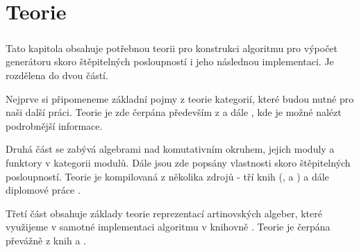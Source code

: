 \chapter{Teorie}

  \paragraph{}Tato kapitola obsahuje potřebnou teorii pro konstrukci algoritmu pro výpočet 
  generátoru skoro štěpitelných posloupností i jeho následnou implementaci. Je 
  rozdělena do dvou částí.
  
  Nejprve si připomeneme základní pojmy z teorie kategorií, které budou nutné pro naši další práci. 
  Teorie je zde čerpána především z \cite{3} a dále \cite{1}, kde je možné nalézt podrobnější informace.  
   
  Druhá část se zabývá algebrami nad komutativním okruhem, jejich 
  moduly a funktory v kategorii modulů. Dále jsou zde popsány vlastnosti
  skoro štěpitelných posloupností. Teorie je kompilovaná z několika 
  zdrojů - tří knih (\cite{2}, \cite{4} a \cite{5}) a dále diplomové práce \cite{3}.
  
  Třetí část obsahuje základy teorie reprezentací artinovských algeber, které 
  využijeme v samotné implementaci algoritmu v knihovně \cite{QPA}. Teorie je čerpána převážně z knih \cite{1} 
  a \cite{2}. \\\\
  \clearpage
  
  
  
 